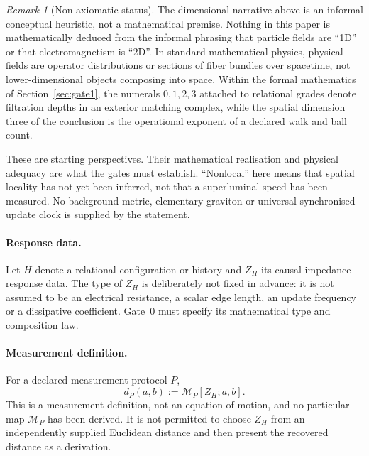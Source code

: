 \documentclass[11pt]{article}
\theoremstyle{definition}
\theoremstyle{remark}
\newtheorem{remark}[theorem]{Remark}
\begin{document}
\begin{remark}[Non-axiomatic status]
The dimensional narrative above is an informal conceptual heuristic, not a mathematical
premise. Nothing in this paper is mathematically deduced from the informal phrasing that
particle fields are ``1D'' or that electromagnetism is ``2D''. In standard mathematical
physics, physical fields are operator distributions or sections of fiber bundles over
spacetime, not lower-dimensional objects composing into space. Within the formal
mathematics of Section~\ref{sec:gate1}, the numerals $0,1,2,3$ attached to relational grades
denote filtration depths in an exterior matching complex, while the spatial dimension
three of the conclusion is the operational exponent of a declared walk and ball count.
\end{remark}

These are starting perspectives. Their mathematical realisation and physical adequacy are what
the gates must establish. ``Nonlocal'' here means that spatial locality has not yet been
inferred, not that a superluminal speed has been measured. No background metric,
elementary graviton or universal synchronised update clock is supplied by the statement.

\paragraph{Response data.} Let $H$ denote a relational configuration or history and
$Z_H$ its causal-impedance response data. The type of $Z_H$ is deliberately not fixed in
advance: it is not assumed to be an electrical resistance, a scalar edge length, an
update frequency or a dissipative coefficient. Gate~0 must specify its mathematical type
and composition law.

\paragraph{Measurement definition.} For a declared measurement protocol $P$,
\begin{equation}
d_P(a,b) := \mathcal M_P[Z_H; a,b].
\label{eq:measurement}
\end{equation}
This is a measurement definition, not an equation of motion, and no particular map
$\mathcal M_P$ has been derived. It is not permitted to choose $Z_H$ from an independently
supplied Euclidean distance and then present the recovered distance as a derivation.
\end{document}
